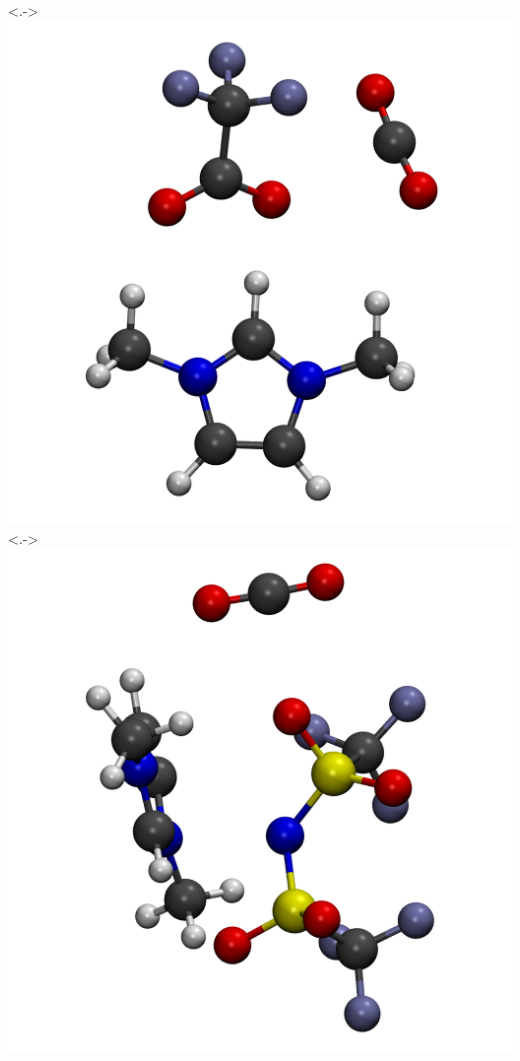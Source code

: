 \documentclass{beamer}
\begin{document}
\begin{frame}
\begin{columns}
    \uncover<.->{\includegraphics[scale=0.07]{./figures/cluster_TFA.png}}
    \uncover<.->{\includegraphics[scale=0.08]{./figures/cluster_Tf2N.png}}

\end{columns}
\end{frame}
\end{document}
